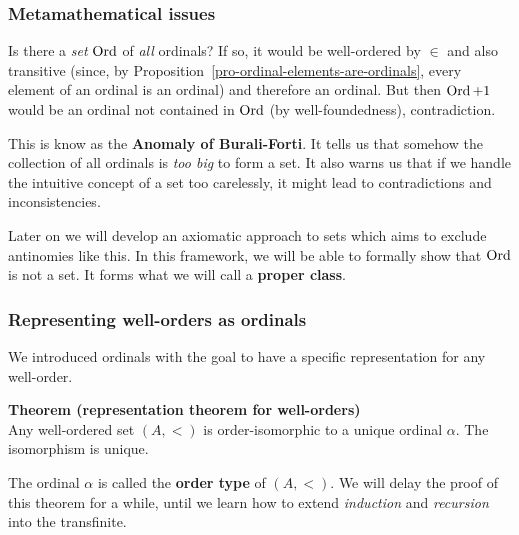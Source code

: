 \subsubsection{Metamathematical issues}

Is there a \textit{set} $\operatorname{Ord}$ of \textit{all} ordinals? If so, it would be well-ordered by $\in$ and also transitive (since, by Proposition~\ref{pro-ordinal-elements-are-ordinals}, every element of an ordinal is an ordinal) and therefore an ordinal. But then $\operatorname{Ord}+1$ would be an ordinal not contained in $\operatorname{Ord}$ (by well-foundedness), contradiction.

This is know as the \textbf{Anomaly of Burali-Forti}. It tells us that somehow the collection of all ordinals is \textit{too big} to form a set. It also warns us that if we handle the intuitive concept of a set too carelessly, it might lead to contradictions and inconsistencies.

Later on we will develop an axiomatic approach to sets which aims to exclude antinomies like this. In this framework, we will be able to formally show that $\operatorname{Ord}$ is not a set. It forms what we will call a \textbf{proper class}.

\subsubsection{Representing well-orders as ordinals}

We introduced ordinals with the goal to have a specific representation for any well-order.

\begin{framed}
\textbf{Theorem (representation theorem for well-orders)}\\
Any well-ordered set $(A,<)$ is order-isomorphic to a unique ordinal $\alpha$. The isomorphism is unique.
\end{framed}

The ordinal $\alpha$ is called the \textbf{order type} of $(A,<)$.
We will delay the proof of this theorem for a while, until we learn how to extend \textit{induction} and \textit{recursion} into the transfinite.